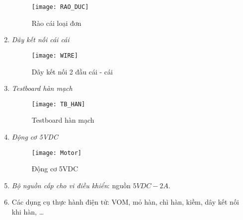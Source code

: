 \begin{enumerate}
\begin{figure}[h]
\begin{center}
\texttt{[image: RAO\_DUC]}
\end{center}
\caption{Rào cái loại đơn}
\end{figure}
\newpage
\item \textit{Dây kết nối cái cái}
\begin{figure}[h]
\begin{center}
\texttt{[image: WIRE]}
\end{center}
\caption{Dây kết nối 2 đầu cái - cái}
\end{figure}
\item \textit{Testboard hàn mạch}
\begin{figure}[h]
\begin{center}
\texttt{[image: TB\_HAN]}
\end{center}
\caption{Testboard hàn mạch}
\end{figure}
\item \textit{Động cơ 5VDC}
\begin{figure}[h]
\begin{center}
\texttt{[image: Motor]}
\end{center}
\caption{Động cơ 5VDC}
\end{figure}
\item \textit{Bộ nguồn cấp cho vi điều khiển}: nguồn $5VDC - 2A$.
\item Các dụng cụ thực hành điện tử: VOM, mỏ hàn, chì hàn, kiềm, dây kết nối khi hàn, \ldots
\end{enumerate}